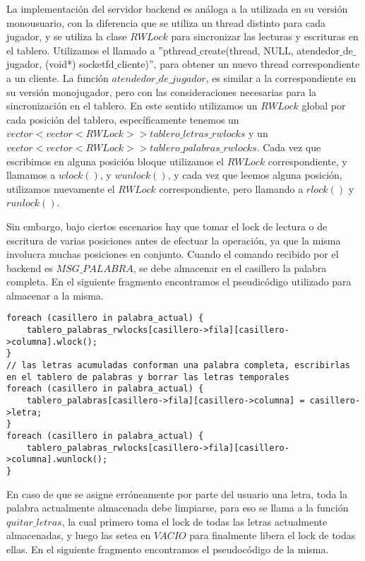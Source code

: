 La implementación del servidor backend es análoga a la utilizada en su versión monousuario, con la diferencia que se utiliza un thread distinto para cada jugador, y se utiliza la clase $RWLock$ para sincronizar las lecturas y escrituras en el tablero. Utilizamos el llamado a ''pthread$\_$create(thread, NULL, atendedor$\_$de$\_$jugador, (void*) socketfd$\_$cliente)'', para obtener un nuevo thread correspondiente a un cliente. La función $atendedor\_de\_jugador$, es similar a la correspondiente en su versión monojugador, pero con las consideraciones necesarias para la sincronización en el tablero. En este sentido utilizamos un $RWLock$ global por cada posición del tablero, específicamente tenemos un $ vector<vector<RWLock> > tablero\_letras\_rwlocks$ y un $vector<vector<RWLock> > tablero\_palabras\_rwlocks $. Cada vez que escribimos en alguna posición bloque utilizamos el $RWLock$ correspondiente, y llamamos a $ wlock() $, y $ wunlock() $, y cada vez que leemos alguna posición, utilizamos nuevamente el $RWLock$ correspondiente, pero llamando a $ rlock() $ y $ runlock() $.

Sin embargo, bajo ciertos escenarios hay que tomar el lock de lectura o de escritura de varias posiciones antes de efectuar la operación, ya que la misma involucra muchas posiciones en conjunto. Cuando el comando recibido por el backend es $MSG\_PALABRA$, se debe almacenar en el casillero la palabra completa. En el siguiente fragmento encontramos el pseudicódigo utilizado para almacenar a la misma. 

\lstset{language=[Sharp]C}
\begin{lstlisting}
foreach (casillero in palabra_actual) {
    tablero_palabras_rwlocks[casillero->fila][casillero->columna].wlock();
}
// las letras acumuladas conforman una palabra completa, escribirlas en el tablero de palabras y borrar las letras temporales
foreach (casillero in palabra_actual) {
    tablero_palabras[casillero->fila][casillero->columna] = casillero->letra;
}
foreach (casillero in palabra_actual) {
    tablero_palabras_rwlocks[casillero->fila][casillero->columna].wunlock();
}
\end{lstlisting}

En caso de que se asigne erróneamente por parte del usuario una letra, toda la palabra actualmente almacenada debe limpiarse, para eso se llama a la función $ quitar\_letras $, la cual primero toma el lock de todas las letras actualmente almacenadas, y luego las setea en $VACIO$ para finalmente libera el lock de todas ellas.
En el siguiente fragmento encontramos el pseudocódigo de la misma.

